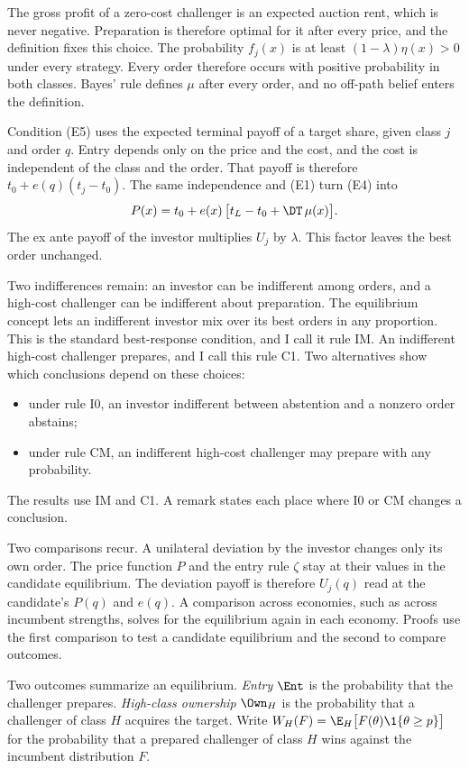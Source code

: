 The gross profit of a zero-cost challenger is an expected auction rent, which is never negative. Preparation is
therefore optimal for it after every price, and the definition fixes this choice. The probability \(f_j(x)\) is
at least \((1-\lambda)\eta(x)>0\) under every strategy. Every order therefore occurs with positive probability in
both classes. Bayes' rule defines \(\mu\) after every order, and no off-path belief enters the definition.

Condition (E5) uses the expected terminal payoff of a target share, given class \(j\) and order \(q\). Entry
depends only on the price and the cost, and the cost is independent of the class and the order. That payoff is
therefore \(t_0+e(q)(t_j-t_0)\). The same independence and (E1) turn (E4) into
\begin{equation}\label{eq:price}
P(x)=t_0+e(x)\,\bigl[t_L-t_0+\DT\,\mu(x)\bigr].
\end{equation}
The ex ante payoff of the investor multiplies \(U_j\) by \(\lambda\). This factor leaves the best order
unchanged.

Two indifferences remain: an investor can be indifferent among orders, and a high-cost challenger can be
indifferent about preparation. The equilibrium concept lets an indifferent investor mix over its best orders in
any proportion. This is the standard best-response condition, and I call it rule IM. An indifferent high-cost
challenger prepares, and I call this rule C1. Two alternatives show which conclusions depend on these choices:
\begin{itemize}[leftmargin=2em]
\item under rule I0, an investor indifferent between abstention and a nonzero order abstains;
\item under rule CM, an indifferent high-cost challenger may prepare with any probability.
\end{itemize}
The results use IM and C1. A remark states each place where I0 or CM changes a conclusion.

Two comparisons recur. A unilateral deviation by the investor changes only its own order. The price function
\(P\) and the entry rule \(\zeta\) stay at their values in the candidate equilibrium. The deviation payoff is
therefore \(U_j(q)\) read at the candidate's \(P(q)\) and \(e(q)\). A comparison across economies, such as
across incumbent strengths, solves for the equilibrium again in each economy. Proofs use the first comparison to
test a candidate equilibrium and the second to compare outcomes.

Two outcomes summarize an equilibrium. \emph{Entry} \(\Ent\) is the probability that the challenger prepares.
\emph{High-class ownership} \(\Own_H\) is the probability that a challenger of class \(H\) acquires the target.
Write \(W_H(F)=\E_H\bigl[F(\theta)\1\{\theta\ge p\}\bigr]\) for the probability that a prepared challenger of
class \(H\) wins against the incumbent distribution \(F\).
